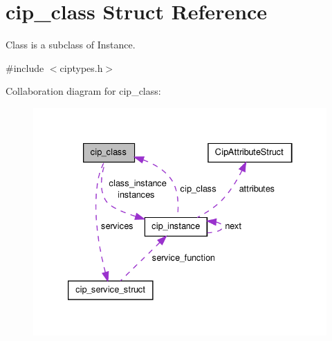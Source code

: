 \hypertarget{structcip__class}{\section{cip\-\_\-class \-Struct \-Reference}
\label{da/d8e/structcip__class}
}


\-Class is a subclass of \-Instance.  




{\ttfamily \#include $<$ciptypes.\-h$>$}



\-Collaboration diagram for cip\-\_\-class\-:
\nopagebreak
\begin{figure}[H]
\begin{center}
\leavevmode
\includegraphics[width=333pt]{d8/df2/structcip__class__coll__graph}
\end{center}
\end{figure}
